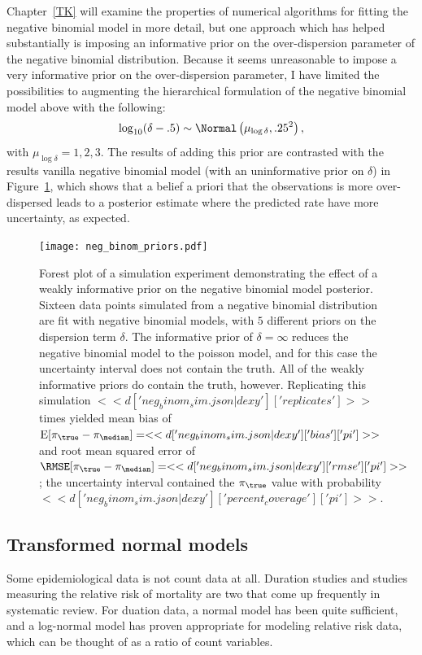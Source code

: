 Chapter~\ref{TK} will examine the properties of numerical algorithms
for fitting the negative binomial model in more detail, but one
approach which has helped substantially is imposing an informative
prior on the over-dispersion parameter of the negative binomial
distribution.  Because it seems unreasonable to impose a very
informative prior on the over-dispersion parameter, I have limited the
possibilities to augmenting the hierarchical formulation of the
negative binomial model above with the following:
\[
\log_{10} (\delta-.5) \sim \Normal\left(\mu_{\log\delta}, .25^2\right),
\]
with $\mu_{\log\delta} = 1, 2, 3$.  The results of adding this
prior are contrasted with the results vanilla negative binomial model
(with an uninformative prior on $\delta$) in
Figure~\ref{fig:theory-rate_model-neg_binom_priors}, which shows that
a belief a priori that the observations is more over-dispersed leads
to a posterior estimate where the predicted rate have more
uncertainty, as expected.

\begin{figure}
\begin{center}
\texttt{[image: neg\_binom\_priors.pdf]}
\end{center}
\caption{Forest plot of a simulation experiment demonstrating the
  effect of a weakly informative prior on the negative binomial model
  posterior.  Sixteen data points simulated from a negative binomial
  distribution are fit with negative binomial models, with $5$
  different priors on the dispersion term $\delta$.  The informative
  prior of $\delta = \infty$ reduces the negative binomial model to
  the poisson model, and for this case the uncertainty interval does
  not contain the truth.  All of the weakly informative priors do
  contain the truth, however.  Replicating this simulation
  $<<d['neg_binom_sim.json|dexy']['replicates']>>$ times yielded mean
  bias of
  $\E[\pi_{\true}-\pi_{\median}]=<<d['neg_binom_sim.json|dexy']['bias']['pi']>>$
  and root mean squared error of
  $\RMSE[\pi_{\true}-\pi_{\median}]=<<d['neg_binom_sim.json|dexy']['rmse']['pi']>>$;
  the uncertainty interval contained the $\pi_{\true}$ value with probability
  $<<d['neg_binom_sim.json|dexy']['percent_coverage']['pi']>>$.}
\label{fig:theory-rate_model-neg_binom_priors}
\end{figure}

\subsection{Transformed normal models}
\label{transformed-normal-models}
Some epidemiological data is not count data at all.  Duration studies
and studies measuring the relative risk of mortality are two that come
up frequently in systematic review.  For duation data, a normal model
has been quite sufficient, and a log-normal model has proven
appropriate for modeling relative risk data, which can be thought of
as a ratio of count variables.

